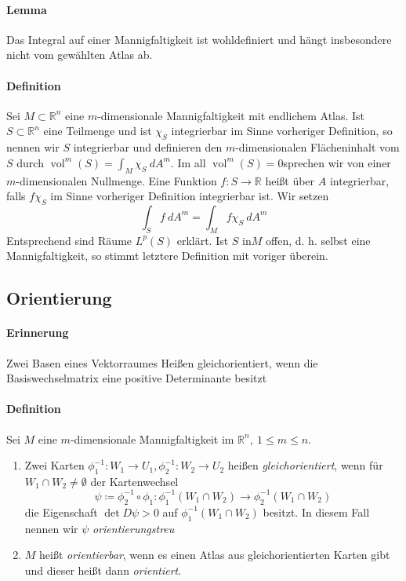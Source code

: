 \documentclass[12pt,a4paper,fleqn]{article}
\def\R{{\mathbb{R}}}
\begin{document}
\paragraph{Lemma} Das Integral auf einer Mannigfaltigkeit ist wohldefiniert und hängt insbesondere nicht vom gewählten Atlas ab.

\paragraph{Definition} Sei $M \subset \R^n$ eine $m$-dimensionale Mannigfaltigkeit mit endlichem Atlas. Ist $S \subset \R^n$ eine Teilmenge und ist $\chi_S$ integrierbar im Sinne vorheriger Definition, so nennen wir $S$ integrierbar und definieren den $m$-dimensionalen Flächeninhalt vom $S$ durch $\operatorname{vol}^m(S) = \int_M \chi_S\ dA^m$. Im all $\operatorname{vol}^m(S) = 0$sprechen wir von einer $m$-dimensionalen Nullmenge. Eine Funktion $f\colon S \rightarrow \R$ heißt über $A$ integrierbar, falls $f\chi_S$ im Sinne vorheriger Definition integrierbar ist. Wir setzen 
\begin{displaymath}
\int_S f\ dA^m = \int_M f\chi_S\ dA^m
\end{displaymath}
Entsprechend sind Räume $L^p(S)$ erklärt. Ist $S$ in$M$ offen, d. h. selbst eine Mannigfaltigkeit, so stimmt letztere Definition mit voriger überein.

\subsection{Orientierung}

\paragraph{Erinnerung} Zwei Basen eines Vektorraumes Heißen gleichorientiert, wenn die Basiswechselmatrix eine positive Determinante besitzt

\paragraph{Definition} Sei $M$ eine $m$-dimensionale Mannigfaltigkeit im $\R^n,\ 1\leq m\leq n$.
\begin{enumerate}
\item Zwei Karten $\phi^{-1}_1\colon W_1 \rightarrow U_1, \phi^{-1}_2\colon W_2 \rightarrow U_2$ heißen \textit{gleichorientiert}, wenn für $W_1 \cap W_2 \neq \emptyset$ der Kartenwechsel 
\begin{displaymath}
\psi \coloneqq \phi_2^{-1} \circ \phi_1 \colon \phi_1^{-1}(W_1\cap W_2) \rightarrow \phi_2^{-1}(W_1\cap W_2)
\end{displaymath}
die Eigenschaft $\det D\psi > 0$ auf $\phi_1^{-1}(W_1 \cap W_2)$ besitzt. In diesem Fall nennen wir $\psi$ \textit{orientierungstreu}
\item $M$ heißt \textit{orientierbar}, wenn es einen Atlas aus gleichorientierten Karten gibt und dieser heißt dann \textit{orientiert}.
\end{enumerate}
\end{document}

